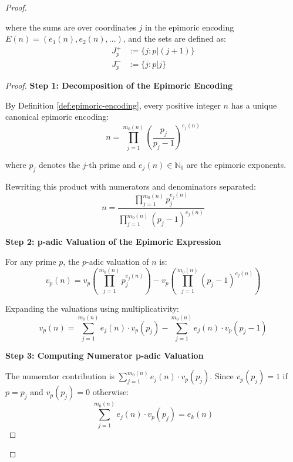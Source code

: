 \begin{proof}
\begin{theorem}
where the sums are over coordinates $j$ in the epimoric encoding $E(n) = (e_1(n), e_2(n), \ldots)$, and the sets are defined as:
\begin{align}
J_p^+ &:= \{j : p|(j+1)\} \\
J_p^- &:= \{j : p|j\}
\end{align}

\end{theorem}

\begin{proof}

\noindent \textbf{Step 1: Decomposition of the Epimoric Encoding}

By Definition \ref{def:epimoric-encoding}, every positive integer $n$ has a unique canonical epimoric encoding:
\begin{equation}
n = \prod_{j=1}^{m_0(n)} \left(\frac{p_j}{p_j - 1}\right)^{e_j(n)}
\end{equation}

where $p_j$ denotes the $j$-th prime and $e_j(n) \in \mathbb{N}_0$ are the epimoric exponents.

Rewriting this product with numerators and denominators separated:
\begin{equation}
n = \frac{\prod_{j=1}^{m_0(n)} p_j^{e_j(n)}}{\prod_{j=1}^{m_0(n)} (p_j - 1)^{e_j(n)}}
\end{equation}

\noindent \textbf{Step 2: p-adic Valuation of the Epimoric Expression}

For any prime $p$, the $p$-adic valuation of $n$ is:
\begin{equation}
v_p(n) = v_p\left(\prod_{j=1}^{m_0(n)} p_j^{e_j(n)}\right) - v_p\left(\prod_{j=1}^{m_0(n)} (p_j - 1)^{e_j(n)}\right)
\end{equation}

Expanding the valuations using multiplicativity:
\begin{equation}
v_p(n) = \sum_{j=1}^{m_0(n)} e_j(n) \cdot v_p(p_j) - \sum_{j=1}^{m_0(n)} e_j(n) \cdot v_p(p_j - 1)
\end{equation}

\noindent \textbf{Step 3: Computing Numerator p-adic Valuation}

The numerator contribution is $\sum_{j=1}^{m_0(n)} e_j(n) \cdot v_p(p_j)$. Since $v_p(p_j) = 1$ if $p = p_j$ and $v_p(p_j) = 0$ otherwise:
\begin{equation}
\sum_{j=1}^{m_0(n)} e_j(n) \cdot v_p(p_j) = e_k(n)
\end{equation}


\end{proof}
\end{proof}
